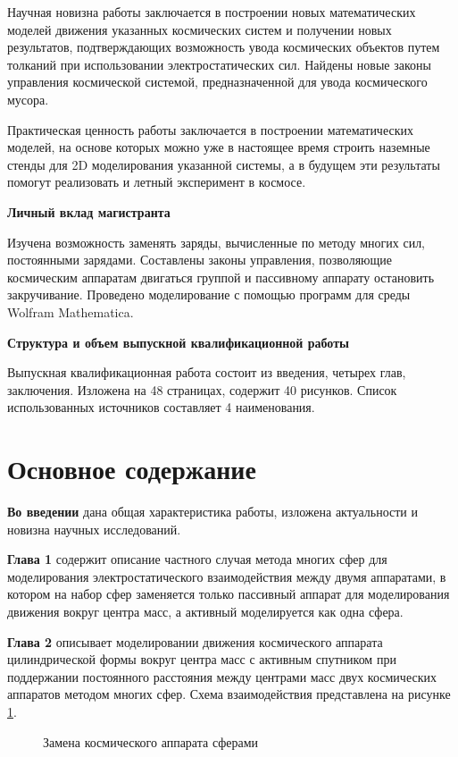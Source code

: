 Научная новизна работы заключается в построении новых математических моделей движения указанных космических систем и получении новых результатов, подтверждающих возможность увода космических объектов путем толканий при использовании электростатических сил. Найдены новые законы управления космической системой, предназначенной для увода космического мусора.

Практическая ценность работы заключается в построении математических моделей, на основе которых можно уже в настоящее время строить наземные стенды для 2D моделирования указанной системы, а в будущем эти результаты помогут реализовать и летный эксперимент в космосе.

\textbf{Личный вклад магистранта}

Изучена возможность заменять заряды, вычисленные по методу многих сил, постоянными зарядами. Составлены законы управления, позволяющие космическим аппаратам двигаться группой и пассивному аппарату остановить закручивание. Проведено моделирование с помощью программ для среды Wolfram Mathematica.

\textbf{Структура и объем выпускной квалификационной работы}

Выпускная квалификационная работа состоит из введения, четырех глав, заключения. Изложена на 48 страницах, содержит 40 рисунков. Список использованных источников составляет 4 наименования.

\section*{Основное содержание}

\textbf{Во введении} дана общая характеристика работы, изложена актуальности и новизна научных исследований.

\textbf{Глава 1} содержит описание частного случая метода многих сфер для моделирования электростатического взаимодействия между двумя аппаратами, в котором на набор сфер заменяется только пассивный аппарат для моделирования движения вокруг центра масс, а активный моделируется как одна сфера.

\textbf{Глава 2} описывает моделировании движения космического аппарата цилиндрической формы вокруг центра масс с активным спутником при поддержании постоянного расстояния между центрами масс двух космических аппаратов методом многих сфер.
Схема взаимодействия представлена на рисунке \ref{ris:3sph}.

\begin{figure}[H]
	\caption{Замена космического аппарата сферами}
	\label{ris:3sph}
\end{figure} 

